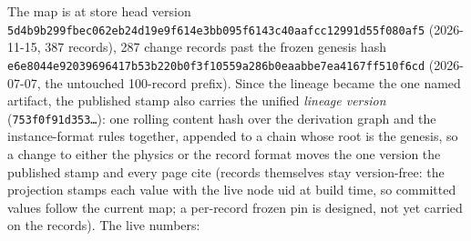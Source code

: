 \documentclass[11pt,a4paper]{article}
\begin{document}
The map is at store head version
\texttt{5d4b9b299fbec062eb24d19e9f614e3bb095f6143c40aafcc12991d55f080af5}
(2026-11-15, 387 records), 287 change records past the frozen genesis hash
\texttt{e6e8044e92039696417b53b220b0f3f10559a286b0eaabbe7ea4167ff510f6cd}
(2026-07-07, the untouched 100-record prefix). Since the lineage became the one
named artifact, the published stamp also carries the unified \emph{lineage
version} (\texttt{753f0f91d353\ldots}): one rolling content hash over the
derivation graph and the instance-format rules together, appended to a chain
whose root is the genesis, so a change to either the physics or the record
format moves the one version the published stamp and every page cite (records
themselves stay version-free: the projection stamps each value with the live
node uid at build time, so committed values follow the current map; a
per-record frozen pin is designed, not yet carried on the records). The live
numbers:
\end{document}
